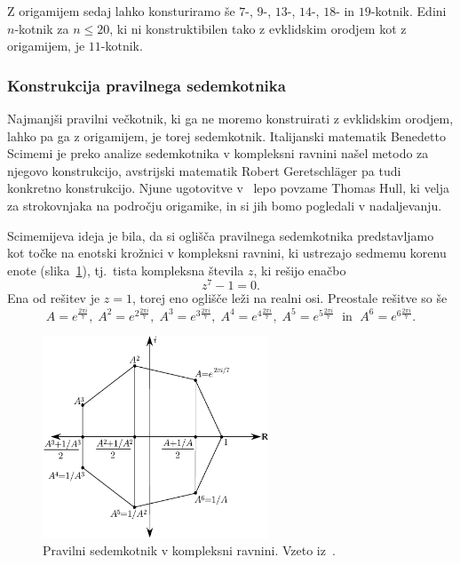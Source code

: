 Z origamijem sedaj lahko konsturiramo še $7$-, $9$-, $13$-, $14$-, $18$- in $19$-kotnik. Edini $n$-kotnik za $n \leq 20$, ki ni konstruktibilen tako z evklidskim orodjem kot z origamijem, je $11$-kotnik.

\subsubsection*{Konstrukcija pravilnega sedemkotnika}

Najmanjši pravilni večkotnik, ki ga ne moremo konstruirati z evklidskim orodjem, lahko pa ga z origamijem, je torej sedemkotnik. Italijanski matematik Benedetto Scimemi je preko analize sedemkotnika v kompleksni ravnini našel metodo za njegovo konstrukcijo, avstrijski matematik  Robert Geretschläger pa tudi konkretno konstrukcijo. Njune ugotovitve v~\cite{hull2009} lepo povzame Thomas Hull, ki velja za strokovnjaka na področju origamike, in si jih bomo pogledali v nadaljevanju.

Scimemijeva ideja je bila, da si oglišča pravilnega sedemkotnika predstavljamo kot točke na enotski krožnici v kompleksni ravnini, ki ustrezajo sedmemu korenu enote (slika~\ref{fig:7kotnik_kompleksna}), tj.\ tista kompleksna števila $z$, ki rešijo enačbo
\begin{equation}
    \label{eq:7kotnik_basic}
    z^7 - 1 = 0.
\end{equation}
Ena od rešitev je $z=1$, torej eno oglišče leži na realni osi. Preostale rešitve so še
$$ A = e^{\frac{2\pi i}{7}}, \; A^2 = e^{2\frac{2\pi i}{7}}, \; A^3 = e^{3\frac{2\pi i}{7}}, \; A^4 = e^{4\frac{2\pi i}{7}}, \; A^5 = e^{5\frac{2\pi i}{7}} \; \text{ in } \; A^6 = e^{6\frac{2\pi i}{7}}.$$
\begin{figure}[h]
    \centering
    \includegraphics[width=0.6\textwidth]{images/n-kotniki/7kotnik_enotska_kroznica.png}
    \caption[Pravilni sedemkotnik v kompleksni ravnini]{Pravilni sedemkotnik v kompleksni ravnini. Vzeto iz~\cite[str.\ 182]{hull2009}.}
    \label{fig:7kotnik_kompleksna}
\end{figure}

